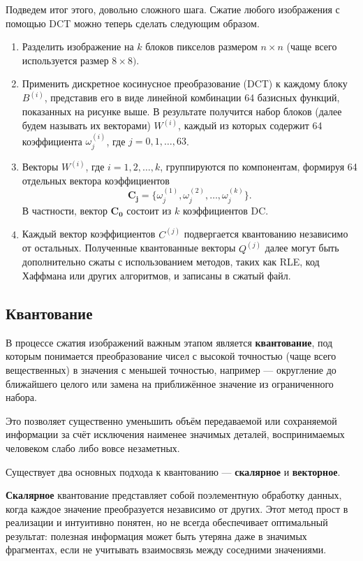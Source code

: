  Подведем итог этого, довольно сложного шага. Сжатие любого изображения с помощью DCT можно теперь сделать следующим образом.


 \begin{enumerate}
    \item Разделить изображение на $k$ блоков пикселов размером $n \times n$ (чаще всего используется размер $8 \times 8)$.
    \item Применить дискретное косинусное преобразование (DCT) к каждому блоку $B^{(i)}$, представив его в виде линейной комбинации
    64 базисных функций, показанных на рисунке выше. В результате получится набор блоков (далее будем называть их векторами) $W^{(i)}$,
    каждый из которых содержит 64 коэффициента $\omega^{(i)}_{j}$, где $j = 0, 1, \dots, 63$.
    \item Векторы $W^{(i)}$, где $i = 1, 2, \dots, k$, группируются по компонентам, формируя 64 отдельных вектора коэффициентов
    $$
    \mathbf{C_j} = \{ \omega^{(1)}_j, \omega^{(2)}_j, \dots, \omega^{(k)}_j \}.
    $$
    В частности, вектор $\mathbf{C_0}$ состоит из $k$ коэффициентов DC.
    \item Каждый вектор коэффициентов $C^{(j)}$ подвергается квантованию независимо от остальных. 
    Полученные квантованные векторы $Q^{(j)}$ далее могут быть дополнительно сжаты с использованием методов, 
    таких как RLE, код Хаффмана или других алгоритмов, и записаны в сжатый файл.
 \end{enumerate}



\subsection{Квантование}

В процессе сжатия изображений важным этапом является \textbf{квантование}, 
под которым понимается преобразование чисел с высокой точностью (чаще всего вещественных) в значения с меньшей точностью, 
например — округление до ближайшего целого или замена на приближённое значение из ограниченного набора. 

Это позволяет существенно уменьшить объём передаваемой или сохраняемой информации за счёт исключения наименее значимых деталей, 
воспринимаемых человеком слабо либо вовсе незаметных.

Существует два основных подхода к квантованию — \textbf{скалярное} и \textbf{векторное}.

\textbf{Скалярное} квантование представляет собой поэлементную обработку данных, 
когда каждое значение преобразуется независимо от других. 
Этот метод прост в реализации и интуитивно понятен, но не всегда обеспечивает оптимальный результат: 
полезная информация может быть утеряна даже в значимых фрагментах, если не учитывать взаимосвязь между соседними значениями.

